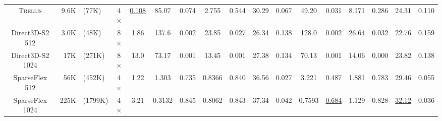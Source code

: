 \documentclass[10pt,twocolumn,letterpaper]{article}
\begin{document}
\begin{table}[t]
\begin{tabular}{cr@{\,}lcccccccccccccc}
        \textsc{Trellis} & 9.6K & \tiny{(77K)} & 4$\times$ & \underline{\cellcolor[rgb]{0.82,1.00,0.80}0.108} & \cellcolor[rgb]{1.00,0.85,0.80}85.07 & \cellcolor[rgb]{1.00,0.83,0.80}0.074 & \cellcolor[rgb]{0.90,1.00,0.80}2.755 & \cellcolor[rgb]{0.95,1.00,0.80}0.544 & \cellcolor[rgb]{1.00,0.89,0.80}30.29 & \cellcolor[rgb]{0.99,1.00,0.80}0.067 & \cellcolor[rgb]{1.00,0.91,0.80}49.20 & \cellcolor[rgb]{1.00,0.81,0.80}0.031 & \cellcolor[rgb]{0.93,1.00,0.80}8.171 & \cellcolor[rgb]{1.00,0.93,0.80}0.286 & \cellcolor[rgb]{1.00,0.87,0.80}24.31 & \cellcolor[rgb]{1.00,0.96,0.80}0.110 \\
        Direct3D-S2 512 & 3.0K & \tiny{(48K)} & 8$\times$ & \cellcolor[rgb]{1.00,1.00,0.80}1.86 & \cellcolor[rgb]{1.00,0.83,0.80}137.6 & \cellcolor[rgb]{1.00,0.80,0.80}0.002 & \cellcolor[rgb]{1.00,0.96,0.80}23.85 & \cellcolor[rgb]{1.00,0.81,0.80}0.027 & \cellcolor[rgb]{1.00,0.80,0.80}26.34 & \cellcolor[rgb]{1.00,0.80,0.80}0.138 & \cellcolor[rgb]{1.00,0.88,0.80}128.0 & \cellcolor[rgb]{1.00,0.80,0.80}0.002 & \cellcolor[rgb]{0.99,1.00,0.80}26.64 & \cellcolor[rgb]{1.00,0.81,0.80}0.032 & \cellcolor[rgb]{1.00,0.82,0.80}22.76 & \cellcolor[rgb]{1.00,0.84,0.80}0.159 \\
        Direct3D-S2 1024 & 17K & \tiny{(271K)} & 8$\times$ & \cellcolor[rgb]{1.00,0.88,0.80}13.0 & \cellcolor[rgb]{1.00,0.86,0.80}73.17 & \cellcolor[rgb]{1.00,0.80,0.80}0.001 & \cellcolor[rgb]{1.00,1.00,0.80}13.45 & \cellcolor[rgb]{1.00,0.80,0.80}0.001 & \cellcolor[rgb]{1.00,0.82,0.80}27.38 & \cellcolor[rgb]{1.00,0.81,0.80}0.134 & \cellcolor[rgb]{1.00,0.90,0.80}70.13 & \cellcolor[rgb]{1.00,0.80,0.80}0.001 & \cellcolor[rgb]{0.96,1.00,0.80}14.06 & \cellcolor[rgb]{1.00,0.80,0.80}0.000 & \cellcolor[rgb]{1.00,0.85,0.80}23.82 & \cellcolor[rgb]{1.00,0.89,0.80}0.138 \\
        SparseFlex 512 & 56K & \tiny{(452K)} & 4$\times$ & \cellcolor[rgb]{0.98,1.00,0.80}1.22 & \cellcolor[rgb]{1.00,1.00,0.80}1.303 & \cellcolor[rgb]{0.90,1.00,0.80}0.735 & \cellcolor[rgb]{0.82,1.00,0.80}0.8366 & \cellcolor[rgb]{0.81,1.00,0.80}0.840 & \cellcolor[rgb]{0.96,1.00,0.80}36.56 & \cellcolor[rgb]{0.87,1.00,0.80}0.027 & \cellcolor[rgb]{0.99,1.00,0.80}3.221 & \cellcolor[rgb]{0.98,1.00,0.80}0.487 & \cellcolor[rgb]{0.86,1.00,0.80}1.881 & \cellcolor[rgb]{0.83,1.00,0.80}0.783 & \cellcolor[rgb]{0.98,1.00,0.80}29.46 & \cellcolor[rgb]{0.90,1.00,0.80}0.055 \\
        SparseFlex 1024 & 225K & \tiny{(1799K)} & 4$\times$ & \cellcolor[rgb]{1.00,0.96,0.80}3.21 & \cellcolor[rgb]{0.95,1.00,0.80}0.3132 & \cellcolor[rgb]{0.85,1.00,0.80}0.845 & \cellcolor[rgb]{0.82,1.00,0.80}0.8062 & \cellcolor[rgb]{0.81,1.00,0.80}0.843 & \cellcolor[rgb]{0.94,1.00,0.80}37.34 & \cellcolor[rgb]{0.91,1.00,0.80}0.042 & \cellcolor[rgb]{0.94,1.00,0.80}0.7593 & \underline{\cellcolor[rgb]{0.88,1.00,0.80}0.684} & \cellcolor[rgb]{0.83,1.00,0.80}1.129 & \cellcolor[rgb]{0.81,1.00,0.80}0.828 & \underline{\cellcolor[rgb]{0.89,1.00,0.80}32.12} & \cellcolor[rgb]{0.86,1.00,0.80}0.036 \\

\end{tabular}
\end{table}
\end{document}
